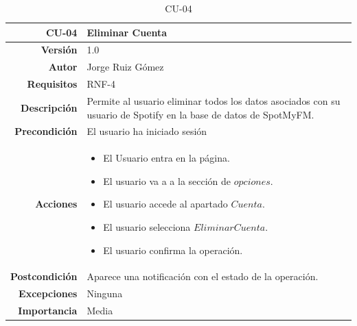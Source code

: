\begin{table}[H]
    \centering
    \begin{tabular}{r|p{}}
    \hline
    \textbf{CU-04}         & \textbf{Eliminar Cuenta}                                 \\ \hline
    \textbf{Versión}       & 1.0                                                     \\
    \textbf{Autor}         & Jorge Ruiz Gómez                                        \\
    \textbf{Requisitos}    & RNF-4                                         \\
    \textbf{Descripción}   & Permite al usuario eliminar todos los datos asociados con su usuario de Spotify en la base de datos de SpotMyFM. \\ \hline
    \textbf{Precondición}  & El usuario ha iniciado sesión                                                 \\
    \textbf{Acciones}      &    \begin{itemize}
                                    \item El Usuario entra en la página.
                                    \item El usuario va a a la sección de $opciones$.
                                    \item El usuario accede al apartado $Cuenta$.
                                    \item El usuario selecciona $Eliminar Cuenta$. 
                                    \item El usuario confirma la operación. 
                                \end{itemize}\\
                                                                              
    \textbf{Postcondición} & Aparece una notificación con el estado de la operación.\\
    \textbf{Excepciones}   & Ninguna                                                 \\
    \textbf{Importancia}   & Media                                                    \\ \hline
    \end{tabular}
    \caption{CU-04}
    \label{tab:CUT-04}
\end{table}


